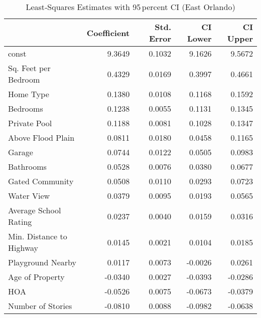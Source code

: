 \begin{table}
\caption{Least‑Squares Estimates with 95 percent CI (East Orlando)}
\label{tab:ols_coeffs_e}
\begin{tabular}{lrrrr}
\toprule
 & Coefficient & Std. Error & CI Lower & CI Upper \\
\midrule
const & 9.3649 & 0.1032 & 9.1626 & 9.5672 \\
Sq. Feet per Bedroom & 0.4329 & 0.0169 & 0.3997 & 0.4661 \\
Home Type & 0.1380 & 0.0108 & 0.1168 & 0.1592 \\
Bedrooms & 0.1238 & 0.0055 & 0.1131 & 0.1345 \\
Private Pool & 0.1188 & 0.0081 & 0.1028 & 0.1347 \\
Above Flood Plain & 0.0811 & 0.0180 & 0.0458 & 0.1165 \\
Garage & 0.0744 & 0.0122 & 0.0505 & 0.0983 \\
Bathrooms & 0.0528 & 0.0076 & 0.0380 & 0.0677 \\
Gated Community & 0.0508 & 0.0110 & 0.0293 & 0.0723 \\
Water View & 0.0379 & 0.0095 & 0.0193 & 0.0565 \\
Average School Rating & 0.0237 & 0.0040 & 0.0159 & 0.0316 \\
Min. Distance to Highway & 0.0145 & 0.0021 & 0.0104 & 0.0185 \\
Playground Nearby & 0.0117 & 0.0073 & -0.0026 & 0.0261 \\
Age of Property & -0.0340 & 0.0027 & -0.0393 & -0.0286 \\
HOA & -0.0526 & 0.0075 & -0.0673 & -0.0379 \\
Number of Stories & -0.0810 & 0.0088 & -0.0982 & -0.0638 \\
\bottomrule
\end{tabular}
\end{table}
